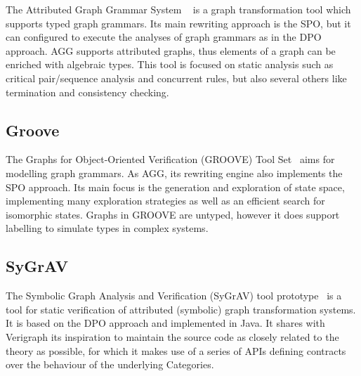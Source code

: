   The Attributed Graph Grammar System ~\cite{Taentzer2000} is a graph transformation tool which supports typed graph grammars.
  Its main rewriting approach is the SPO, but it can configured to execute the analyses of graph grammars as in the DPO approach.
  AGG supports attributed graphs, thus elements of a graph can be enriched with algebraic types.
  This tool is focused on static analysis such as critical pair/sequence analysis and concurrent rules, but also several others like termination and consistency checking.

\subsection{Groove}The Graphs for Object-Oriented Verification (GROOVE) Tool Set~\cite{Rensink2004} aims for modelling graph grammars. As AGG, its rewriting engine also implements the SPO approach. Its main focus is the generation and exploration of state space, implementing many exploration strategies as well as an efficient search for isomorphic states. Graphs in GROOVE are untyped, however it does support labelling to simulate types in complex systems.


\subsection{SyGrAV}

The Symbolic Graph Analysis and Verification (SyGrAV) tool prototype~\cite{Deckwerth2016} is a tool for static verification of attributed (symbolic) graph transformation systems. It is based on the DPO approach and implemented in Java. It shares with Verigraph its inspiration to maintain the source code as closely related to the theory as possible, for which it makes use of a series of APIs defining contracts over the behaviour of the underlying Categories.

